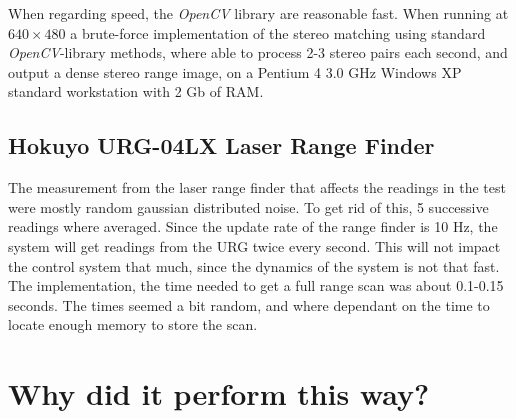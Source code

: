 When regarding speed, the \emph{OpenCV} library are reasonable fast. When running at
$640\times480$ a brute-force implementation of the stereo matching using standard
\emph{OpenCV}-library methods, where able to process 2-3 stereo pairs each second, and
output a dense stereo range image, on a Pentium 4 3.0 GHz Windows XP standard workstation
with 2 Gb of RAM. 



\subsection{Hokuyo URG-04LX Laser Range Finder}
The measurement from the laser range finder that affects the readings in the test were
mostly random gaussian distributed noise. To get rid of this, 5 successive
readings where averaged. Since the update rate of the range finder is 10 Hz, the system
will get readings from the URG twice every second. This will not impact the control system
that much, since the dynamics of the system is not that fast. The implementation, the time
needed to get a full range scan was about 0.1-0.15 seconds. The times seemed a bit random,
and where dependant on the time to locate enough memory to store the scan.  




\section{Why did it perform this way?}




